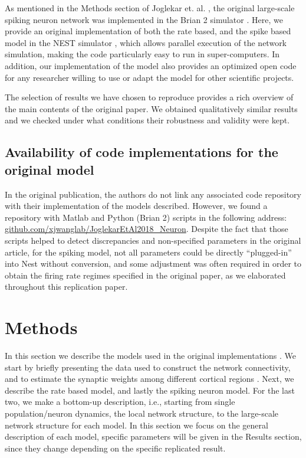 \indent As mentioned in the Methods section of Joglekar et. al. \cite{joglekar2018inter}, the original large-scale spiking neuron network was implemented in the Brian 2 simulator \cite{stimberg2019brian}. Here, we provide an original implementation of both the rate based, and the spike based model in the NEST simulator \cite{gewaltig2007nest, jordan2019nest}, which allows parallel execution of the network simulation, making the code particularly easy to run in super-computers. 
In addition, our implementation of the model also provides an optimized open code for any researcher willing to use or adapt the model for other scientific projects.

The selection of results we have chosen to reproduce provides a rich overview of the main contents of the original paper. We obtained qualitatively similar results and we checked under what conditions their robustness and validity were kept.  


\subsection*{Availability of code implementations for the original model}\label{methods}
In the original publication, the authors do not link any associated code repository with their implementation of the models described. However, we found a repository with Matlab and Python (Brian 2) scripts in the following address:  \href{github.com/xjwanglab/JoglekarEtAl2018_Neuron}{github.com/xjwanglab/JoglekarEtAl2018\_Neuron}. Despite the fact that those scripts helped to detect discrepancies and non-specified parameters in the original article, for the spiking model, not all parameters could be directly ``plugged-in'' into Nest without conversion, and some adjustment was often required in order to obtain the firing rate regimes specified in the original paper, as we elaborated throughout this replication paper.

\section{Methods}\label{methods}

In this section we describe the models used in the original implementations \cite{joglekar2018inter}. We start by briefly presenting the data used to construct the network connectivity, and to estimate the synaptic weights among different cortical regions \cite{markov2014b}. Next, we describe the rate based model, and lastly the spiking neuron model. For the last two, we make a bottom-up description, i.e., starting from single population/neuron dynamics, the local network structure, to the large-scale network structure for each model. In this section we focus on the general description of each model, specific parameters will be given in the Results section, since they change depending on the specific replicated result.

